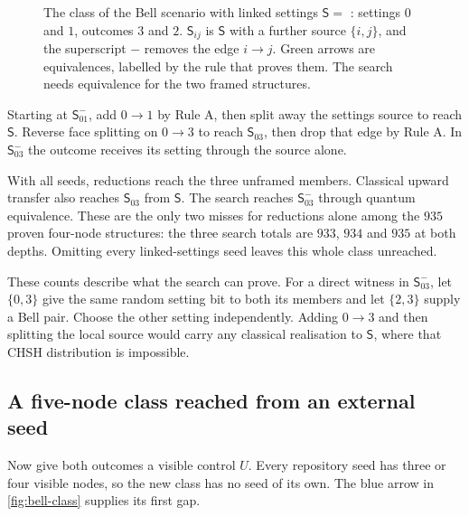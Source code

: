 \begin{figure}[H]
\caption{The class of the Bell scenario with linked settings $\mathsf S=$ :
settings $0$ and $1$, outcomes $3$ and $2$. $\mathsf S_{ij}$ is $\mathsf S$ with a further source $\{i,j\}$, and
the superscript $-$ removes the edge $i\to j$. Green arrows are equivalences, labelled by the rule that proves
them. The search needs equivalence for the two framed structures.}
\label{fig:four-bell}
\end{figure}

Starting at $\mathsf S_{01}^{-}$, add $0\to1$ by Rule A, then split away the settings source to
reach $\mathsf S$. Reverse face splitting on $0\to3$ to reach $\mathsf S_{03}$, then drop that edge
by Rule A. In $\mathsf S_{03}^{-}$ the outcome receives its setting through the source alone.

With all seeds, reductions reach the three unframed members. Classical upward transfer also reaches $\mathsf S_{03}$ from $\mathsf S$. The search reaches $\mathsf S_{03}^{-}$ through quantum equivalence.
These are the only two misses for reductions alone among the $935$ proven four-node structures:
the three search totals are $933$, $934$ and $935$ at both depths. Omitting every linked-settings seed
leaves this whole class unreached.

These counts describe what the search can prove. For a direct witness in $\mathsf S_{03}^{-}$, let
$\{0,3\}$ give the same random setting bit to both its members and let $\{2,3\}$ supply a Bell pair.
Choose the other setting independently. Adding $0\to3$ and then splitting the local source would carry
any classical realisation to $\mathsf S$, where that CHSH distribution is impossible.

\clearpage
\subsection{A five-node class reached from an external seed}\label{sec:only-via}
Now give both outcomes a visible control $U$. Every repository seed has three or four visible nodes,
so the new class has no seed of its own. The blue arrow in \cref{fig:bell-class} supplies its first gap.

